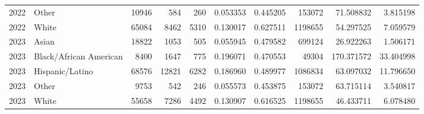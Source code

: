 \begin{tabular}{rlrrrrrrrr}
2022 & Other & 10946 & 584 & 260 & 0.053353 & 0.445205 & 153072 & 71.508832 & 3.815198 \\
2022 & White & 65084 & 8462 & 5310 & 0.130017 & 0.627511 & 1198655 & 54.297525 & 7.059579 \\
2023 & Asian & 18822 & 1053 & 505 & 0.055945 & 0.479582 & 699124 & 26.922263 & 1.506171 \\
2023 & Black/African American & 8400 & 1647 & 775 & 0.196071 & 0.470553 & 49304 & 170.371572 & 33.404998 \\
2023 & Hispanic/Latino & 68576 & 12821 & 6282 & 0.186960 & 0.489977 & 1086834 & 63.097032 & 11.796650 \\
2023 & Other & 9753 & 542 & 246 & 0.055573 & 0.453875 & 153072 & 63.715114 & 3.540817 \\
2023 & White & 55658 & 7286 & 4492 & 0.130907 & 0.616525 & 1198655 & 46.433711 & 6.078480 \\
\bottomrule
\end{tabular}
